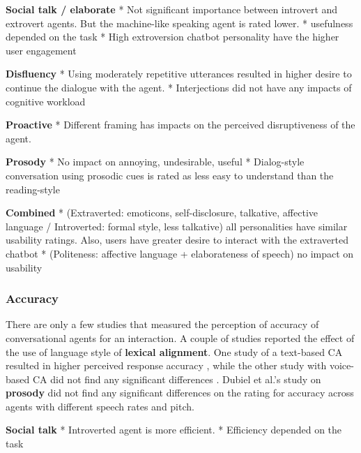\textbf{Social talk / elaborate}
* Not significant importance between introvert and extrovert agents. But the machine-like speaking agent is rated lower. \cite{roy2021users}\cmt{[71]}
* usefulness depended on the task \cite{haas2022keep}\cmt{[78]}
* High extroversion chatbot personality have the higher user engagement \cite{moilanen2022measuring}\cmt{[82]}

\textbf{Disfluency}
* Using moderately repetitive utterances resulted in higher desire to continue the dialogue with the agent. \cite{yang2021effect}\cmt{[72]}
* Interjections did not have any impacts of cognitive workload \cite{ceha2022expressive}\cmt{[77]}

\textbf{Proactive}
* Different framing has impacts on the perceived disruptiveness of the agent. \cite{xiao2021let}\cmt{[73]}

\textbf{Prosody}
* No impact on annoying, undesirable, useful \cite{jestin2022effects}\cmt{[81]}
* Dialog-style conversation using prosodic cues is rated as less easy to understand than the reading-style \cite{misu2011toward}\cmt{[83]}

\textbf{Combined}
* (Extraverted: emoticons, self-disclosure, talkative, affective language / Introverted: formal style, less talkative) all personalities have similar usability ratings. Also, users have greater desire to interact with the extraverted chatbot \cite{volkel2022user}\cmt{[75]}
* (Politeness: affective language + elaborateness of speech) no impact on usability \cite{hu2022polite}\cmt{[76]}


\subsubsection{Accuracy}
There are only a few studies that measured the perception of accuracy of conversational agents for an interaction. A couple of studies reported the effect of the use of language style of \textbf{lexical alignment}. One study of a text-based CA resulted in higher perceived response accuracy \cite{huiyang2022improving}\cmt{[17]}, while the other study with voice-based CA did not find any significant differences \cite{linnemann2018can}\cmt{[15]}. Dubiel et al.'s study \cite{dubiel2020persuasive}\cmt{[60]} on \textbf{prosody} did not find any significant differences on the rating for accuracy across agents with different speech rates and pitch.

\textbf{Social talk}
* Introverted agent is more efficient. \cite{roy2021users}\cmt{[71]}
* Efficiency depended on the task \cite{haas2022keep}\cmt{[78]}

